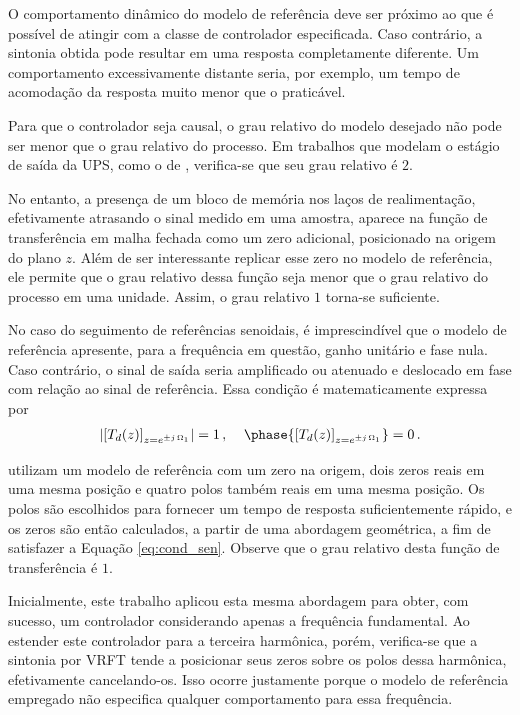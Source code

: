 \documentclass[repeatfields,oneside]{tcc}
\newcommand{\mycdot}{ \, }
\begin{document}
O comportamento dinâmico do modelo de referência deve ser próximo ao que é possível de atingir com a classe de controlador especificada.
Caso contrário, a sintonia obtida pode resultar em uma resposta completamente diferente.
Um comportamento excessivamente distante seria, por exemplo, um tempo de acomodação da resposta muito menor que o praticável.

Para que o controlador seja causal, o grau relativo do modelo desejado não pode ser menor que o grau relativo do processo.
Em trabalhos que modelam o estágio de saída da UPS, como o de \textcite{Pereira2014}, verifica-se que seu grau relativo é $2$.

\newpage
No entanto, a presença de um bloco de memória nos laços de realimentação, efetivamente atrasando o sinal medido em uma amostra, aparece na função de transferência em malha fechada como um zero adicional, posicionado na origem do plano $z$.
Além de ser interessante replicar esse zero no modelo de referência, ele permite que o grau relativo dessa função seja menor que o grau relativo do processo em uma unidade.
Assim, o grau relativo $1$ torna-se suficiente.

No caso do seguimento de referências senoidais, é imprescindível que o modelo de referência apresente, para a frequência em questão, ganho unitário e fase nula.
Caso contrário, o sinal de saída seria amplificado ou atenuado e deslocado em fase com relação ao sinal de referência.
Essa condição é matematicamente expressa por
\begin{equation}
\begin{aligned}
    \left| \left[ T_d(z) \right]_{z = e^{\pm j \mycdot \Omega_1 }} \right| = 1
    \,,\;
    &&
    \phase{\left[ T_d(z) \right]_{z = e^{\pm j \mycdot \Omega_1 }}} = 0
    \,.
\end{aligned}
\label{eq:cond_sen}
\end{equation}

\textcite{Corleta2015, Corleta2016, Bruna2020} utilizam um modelo de referência com um zero na origem, dois zeros reais em uma mesma posição e quatro polos também reais em uma mesma posição.
Os polos são escolhidos para fornecer um tempo de resposta suficientemente rápido, e os zeros são então calculados, a partir de uma abordagem geométrica, a fim de satisfazer a Equação \eqref{eq:cond_sen}.
Observe que o grau relativo desta função de transferência é $1$.

Inicialmente, este trabalho aplicou esta mesma abordagem para obter, com sucesso, um controlador considerando apenas a frequência fundamental.
Ao estender este controlador para a terceira harmônica, porém, verifica-se que a sintonia por VRFT tende a posicionar seus zeros sobre os polos dessa harmônica, efetivamente cancelando-os.
Isso ocorre justamente porque o modelo de referência empregado não especifica qualquer comportamento para essa frequência.
\end{document}

